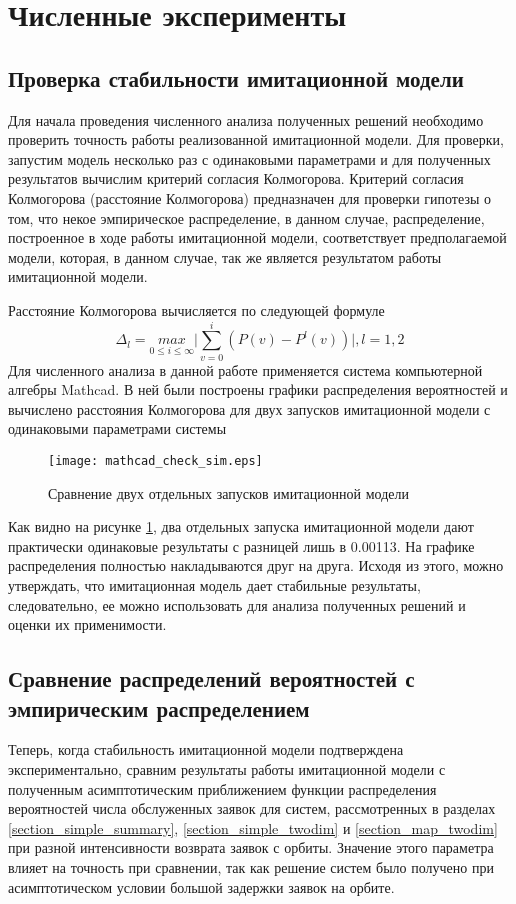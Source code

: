 \section{Численные эксперименты}
\subsection{Проверка стабильности имитационной модели}
Для начала проведения численного анализа полученных решений необходимо проверить точность работы реализованной имитационной модели. Для проверки, запустим модель несколько раз с одинаковыми параметрами и для полученных результатов вычислим критерий согласия Колмогорова. Критерий согласия Колмогорова (расстояние Колмогорова) предназначен для проверки гипотезы о том, что некое эмпирическое распределение, в данном случае, распределение, построенное в ходе работы имитационной модели, соответствует предполагаемой модели, которая, в данном случае, так же является результатом работы имитационной модели.

Расстояние Колмогорова вычисляется по следующей формуле
\begin{equation*}
	\Delta_{l} = \underset{0 \leq i \leq \infty}{max}\bigg\rvert \sum_{v=0}^{i} (P(v) - P^{l}(v))\bigg\rvert, l = 1,2
\end{equation*}
Для численного анализа в данной работе применяется система компьютерной алгебры Mathcad. В ней были построены графики распределения вероятностей и вычислено расстояния Колмогорова для двух запусков имитационной модели с одинаковыми параметрами системы

\begin{figure}[H]
	\centering
	\texttt{[image: mathcad\_check\_sim.eps]}
	\caption{Сравнение двух отдельных запусков имитационной модели}
	\label{experiments_kol_dist_sim}
\end{figure} 

Как видно на рисунке \ref{experiments_kol_dist_sim}, два отдельных запуска имитационной модели дают практически одинаковые результаты с разницей лишь в 0.00113. На графике распределения полностью накладываются друг на друга. Исходя из этого, можно утверждать, что имитационная модель дает стабильные результаты, следовательно, ее можно использовать для анализа полученных решений и оценки их применимости. 
\subsection{Сравнение распределений вероятностей с эмпирическим распределением}
Теперь, когда стабильность имитационной модели подтверждена экспериментально, сравним результаты работы имитационной модели с полученным асимптотическим приближением функции распределения вероятностей числа обслуженных заявок для систем, рассмотренных в разделах \ref{section_simple_summary}, \ref{section_simple_twodim} и \ref{section_map_twodim} при разной интенсивности возврата заявок с орбиты. Значение этого параметра влияет на точность при сравнении, так как решение систем было получено при асимптотическом условии большой задержки заявок на орбите.



